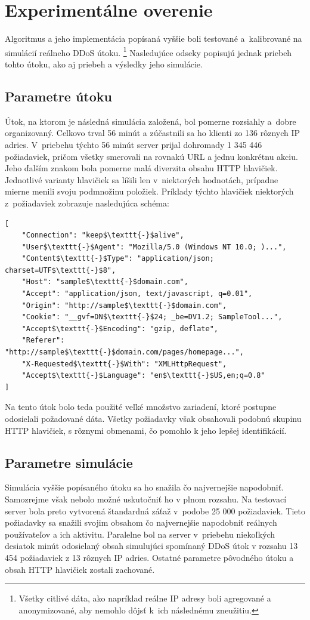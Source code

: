 \documentclass[
  printed, %
  table,   %
  lof,     %
  nolot,   %
  nocover
]{fithesis3}
\begin{document}
\chapter{Experimentálne overenie}
\label{ch:data}
Algoritmus a jeho implementácia popísaná vyššie boli testované a~kalibrované na
simulácií reálneho DDoS útoku. \footnote{Všetky citlivé dáta, ako napríklad reálne IP
adresy boli agregované a anonymizované, aby nemohlo dôjsť k~ich následnému
zneužitiu.} Nasledujúce odseky popisujú jednak priebeh tohto
útoku, ako aj priebeh a výsledky jeho simulácie. 

\section{Parametre útoku}
Útok, na ktorom je následná simulácia založená, bol pomerne rozsiahly a~dobre
organizovaný. Celkovo trval 56 minút a zúčastnili sa ho klienti zo 136 rôznych
IP adries. V~priebehu týchto 56 minút server prijal dohromady 1 345 446 požiadaviek, pričom
všetky smerovali na rovnakú URL a jednu konkrétnu akciu. Jeho ďalším znakom bola
pomerne malá diverzita obsahu HTTP hlavičiek. Jednotlivé varianty hlavičiek sa líšili
len v~niektorých hodnotách, prípadne mierne menili svoju podmnožinu položiek. Príklady týchto hlavičiek
niektorých z~požiadaviek zobrazuje nasledujúca schéma: 

\begin{lstlisting}[basicstyle=\footnotesize, mathescape=true]
[
    "Connection": "keep$\texttt{-}$alive",
    "User$\texttt{-}$Agent": "Mozilla/5.0 (Windows NT 10.0; )...",
    "Content$\texttt{-}$Type": "application/json; charset=UTF$\texttt{-}$8",
    "Host": "sample$\texttt{-}$domain.com",
    "Accept": "application/json, text/javascript, q=0.01",
    "Origin": "http://sample$\texttt{-}$domain.com",
    "Cookie": "__gvf=DN$\texttt{-}$24; _be=DV1.2; SampleTool...",
    "Accept$\texttt{-}$Encoding": "gzip, deflate",
    "Referer": "http://sample$\texttt{-}$domain.com/pages/homepage...",
    "X-Requested$\texttt{-}$With": "XMLHttpRequest",
    "Accept$\texttt{-}$Language": "en$\texttt{-}$US,en;q=0.8"
]
\end{lstlisting}

Na tento útok bolo teda použité veľké množstvo zariadení, ktoré postupne
odosielali požadované dáta. Všetky požiadavky však obsahovali podobnú skupinu
HTTP hlavičiek, s rôznymi obmenami, čo pomohlo k jeho lepšej identifikácií.

\section{Parametre simulácie}
Simulácia vyššie popísaného útoku sa ho snažila čo najvernejšie napodobniť.
Samozrejme však nebolo možné uskutočniť ho v plnom rozsahu. Na testovací server
bola preto vytvorená štandardná záťaž v~podobe 25 000 požiadaviek. Tieto požiadavky
sa snažili svojim obsahom čo najvernejšie napodobniť reálnych používateľov a
ich aktivitu. Paralelne bol na server  v~priebehu niekoľkých desiatok minút
odosielaný obsah simulujúci spomínaný DDoS útok v rozsahu 13 454 požiadaviek z
13 rôznych IP adries. Ostatné parametre pôvodného útoku a obsah HTTP hlavičiek
zostali zachované.
\end{document}
